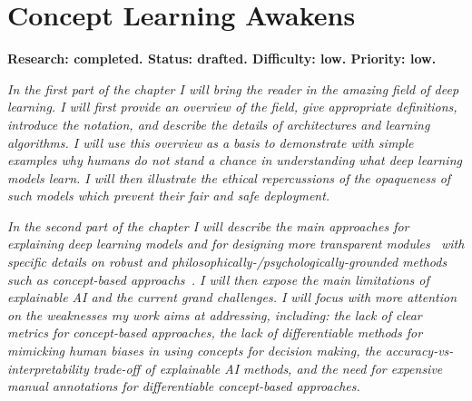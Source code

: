 \documentclass[withindex,glossary]{cam-thesis}
\theoremstyle{plain}
\theoremstyle{definition}
\theoremstyle{remark}
\begin{document}
\chapter{Concept Learning Awakens} \label{chapter:background}
\textbf{Research: completed. Status: drafted. Difficulty: low. Priority: low.}

\textit{In the first part of the chapter I will bring the reader in the amazing field of deep learning. I will first provide an overview of the field, give appropriate definitions, introduce the notation, and describe the details of architectures and learning algorithms. I will use this overview as a basis to demonstrate with simple examples why humans do not stand a chance in understanding what deep learning models learn. I will then illustrate the ethical repercussions of the opaqueness of such models which prevent their fair and safe deployment.}

\textit{In the second part of the chapter I will describe the main approaches for explaining deep learning models and for designing more transparent modules~\citep{duran2021afraid,lo2020ethical,wachter2017counterfactual,gdpr2017,rudin2019stop} with specific details on robust and philosophically-/psychologically-grounded methods such as concept-based approachs~\citep{ghorbani2019towards,kim2018interpretability,shen2022trust}. I will then expose the main limitations of explainable AI and the current grand challenges. I will focus with more attention on the weaknesses my work aims at addressing, including: the lack of clear metrics for concept-based approaches, the lack of differentiable methods for mimicking human biases in using concepts for decision making, the accuracy-vs-interpretability trade-off of explainable AI methods, and the need for expensive manual annotations for differentiable concept-based approaches.}

\end{document}

